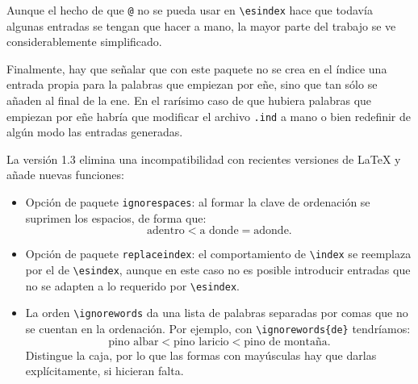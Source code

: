 \documentclass[a4paper]{ltxguide}
\begin{document}
Aunque el hecho de que \verb|@| no se pueda usar en \verb|\esindex|
hace que todavía algunas entradas se tengan que hacer a mano, la mayor
parte del trabajo se ve considerablemente simplificado.

Finalmente, hay que señalar que con este paquete no se crea en el
índice una entrada propia para la palabras que empiezan por eñe, sino
que tan sólo se añaden al final de la ene. En el rarísimo caso de que
hubiera palabras que empiezan por eñe habría que modificar el archivo
\verb|.ind| a mano o bien redefinir de algún modo las entradas
generadas.

La versión 1.3 elimina una incompatibilidad con recientes versiones de
\LaTeX{} y añade nuevas funciones:
\begin{itemize}
\item Opción de paquete \verb|ignorespaces|: al formar la clave de 
ordenación se suprimen los espacios, de forma que:
$$\mbox{adentro} < \mbox{a donde} = \mbox{adonde}.$$
\item Opción de paquete \verb|replaceindex|: el comportamiento de
\verb|\index| se reemplaza por el de \verb|\esindex|, aunque en este
caso no es posible introducir entradas que no se adapten a lo
requerido por \verb|\esindex|.
\item La orden \verb|\ignorewords| da
una lista de palabras separadas por comas que no se cuentan en la
ordenación.  Por ejemplo, con \verb|\ignorewords{de}| tendríamos:
$$\mbox{pino albar} < \mbox{pino laricio} < \mbox{pino de montaña}.$$
Distingue la caja, por lo que las formas con mayúsculas hay que darlas
explícitamente, si hicieran falta.
\end{itemize}
\end{document}
